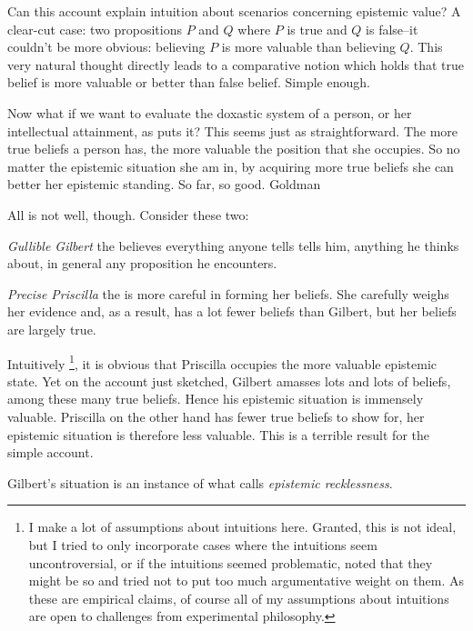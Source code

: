 \documentclass[12pt,numbers=noenddot]{scrartcl}
\begin{document}
Can this account explain intuition about scenarios concerning epistemic value?  A clear-cut case: two propositions $P$ and $Q$ where $P$ is true and $Q$ is false–it couldn't be more obvious: believing $P$ is more valuable than believing $Q$. This very natural thought directly leads to a comparative notion which holds that true belief is more valuable or better than false belief. Simple enough.

Now what if we want to evaluate the doxastic system of a person, or her intellectual attainment, as \textcite[58]{Goldman2002-GOLTUO-2} puts it? This seems just as straightforward. The more true beliefs a person has, the more valuable the position that she occupies. So no matter the epistemic situation she am in, by acquiring more true beliefs she can better her epistemic standing. So far, so good. Goldman\textcite[59]{Goldman2002-GOLTUO-2}

All is not well, though. Consider these two:
\begin{description}
    \item \emph{Gullible Gilbert} the believes everything anyone tells tells him, anything he thinks about, in general any proposition he encounters.
    \item \emph{Precise Priscilla} the is more careful in forming her beliefs. She carefully weighs her evidence and, as a result, has a lot fewer beliefs than Gilbert, but her beliefs are largely true.
\end{description}

Intuitively
\footnote{I make a lot of assumptions about intuitions here. Granted, this is not ideal, but I tried to only incorporate cases where the intuitions seem uncontroversial, or if the intuitions seemed problematic, noted that they might be so and tried not to put too much argumentative weight on them. As these are empirical claims, of course all of my assumptions about intuitions are open to challenges from experimental philosophy.},
it is obvious that Priscilla occupies the more valuable epistemic state. Yet on the account just sketched, Gilbert amasses lots and lots of beliefs, among these many true beliefs. Hence his epistemic situation is immensely valuable. Priscilla on the other hand has fewer true beliefs to show for, her epistemic situation is therefore less valuable. This is a terrible result for the simple account.

Gilbert’s situation is an instance of what \textcite[360]{Berker2013-BERETA-2} calls \emph{epistemic recklessness}. 
\end{document}
